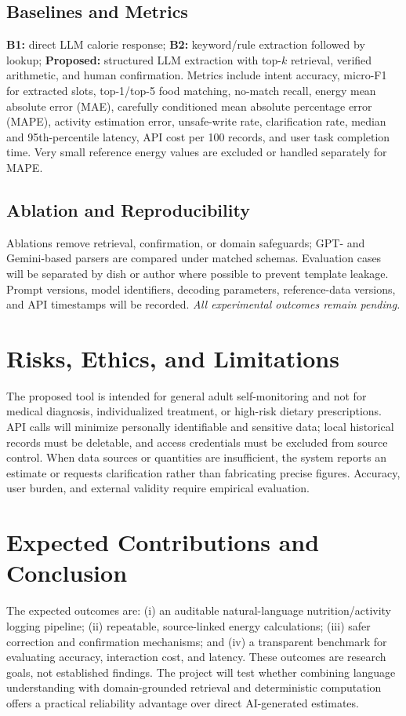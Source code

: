 \documentclass[journal,10pt]{IEEEtran}
\begin{document}
\subsection{Baselines and Metrics}
\textbf{B1:} direct LLM calorie response; \textbf{B2:} keyword/rule extraction followed by lookup; \textbf{Proposed:} structured LLM extraction with top-$k$ retrieval, verified arithmetic, and human confirmation. Metrics include intent accuracy, micro-F1 for extracted slots, top-1/top-5 food matching, no-match recall, energy mean absolute error (MAE), carefully conditioned mean absolute percentage error (MAPE), activity estimation error, unsafe-write rate, clarification rate, median and 95th-percentile latency, API cost per 100 records, and user task completion time. Very small reference energy values are excluded or handled separately for MAPE.
\subsection{Ablation and Reproducibility}
Ablations remove retrieval, confirmation, or domain safeguards; GPT- and Gemini-based parsers are compared under matched schemas. Evaluation cases will be separated by dish or author where possible to prevent template leakage. Prompt versions, model identifiers, decoding parameters, reference-data versions, and API timestamps will be recorded. \emph{All experimental outcomes remain pending.}

\section{Risks, Ethics, and Limitations}
The proposed tool is intended for general adult self-monitoring and not for medical diagnosis, individualized treatment, or high-risk dietary prescriptions. API calls will minimize personally identifiable and sensitive data; local historical records must be deletable, and access credentials must be excluded from source control. When data sources or quantities are insufficient, the system reports an estimate or requests clarification rather than fabricating precise figures. Accuracy, user burden, and external validity require empirical evaluation.

\section{Expected Contributions and Conclusion}
The expected outcomes are: (i) an auditable natural-language nutrition/activity logging pipeline; (ii) repeatable, source-linked energy calculations; (iii) safer correction and confirmation mechanisms; and (iv) a transparent benchmark for evaluating accuracy, interaction cost, and latency. These outcomes are research goals, not established findings. The project will test whether combining language understanding with domain-grounded retrieval and deterministic computation offers a practical reliability advantage over direct AI-generated estimates.
\end{document}
